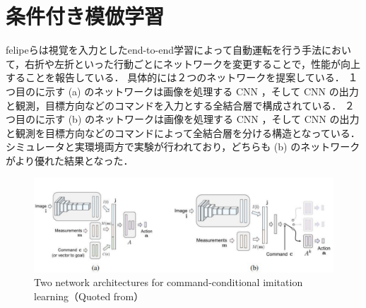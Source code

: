\section{条件付き模倣学習}
felipeらは視覚を入力としたend-to-end学習によって自動運転を行う手法において，右折や左折といった行動ごとにネットワークを変更することで，性能が向上することを報告している．
具体的には２つのネットワークを提案している．
１つ目のに示す (a) のネットワークは画像を処理する CNN ，そして CNN の出力と観測，目標方向などのコマンドを入力とする全結合層で構成されている．
２つ目のに示す (b) のネットワークは画像を処理する CNN ，そして CNN の出力と観測を目標方向などのコマンドによって全結合層を分ける構造となっている．
シミュレータと実環境両方で実験が行われており，どちらも (b) のネットワークがより優れた結果となった．

\begin{figure}[htbp]
  \centering
  \includegraphics[width=140mm]{images/pdf/other/branched.pdf}
  \caption{Two network architectures for command-conditional imitation learning（Quoted from\cite{codevilla2018endtoend}）}
  \label{fig:felipe_branched}
\end{figure}